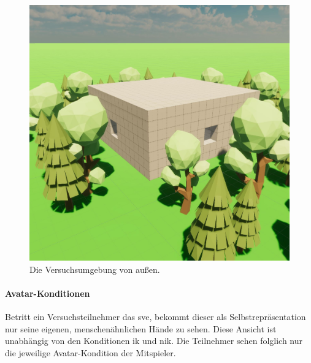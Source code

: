 \documentclass[a4paper,11pt]{article}%
\renewcommand{\\}{\vspace*{0.5\baselineskip} \newline}
\begin{document}
{\begin{figure}[H]
		\begin{footnotesize}
		\centering
			\includegraphics[scale=0.4]{Abbildungen/Versuchsumgebung/Raum.JPG}
			\caption[Die Versuchsumgebung von außen]{Die Versuchsumgebung von außen.}
			\label{Versuchsumgebung}
		\end{footnotesize}
	\end{figure}

\paragraph{Avatar-Konditionen}
Betritt ein Versuchsteilnehmer das \ac{sve}, bekommt dieser als Selbstrepräsentation nur seine eigenen, menschenähnlichen Hände zu sehen. Diese Ansicht ist unabhängig von den Konditionen \ac{ik} und \ac{nik}. Die Teilnehmer sehen folglich nur die jeweilige Avatar-Kondition der Mitspieler. 

}
\end{document}
